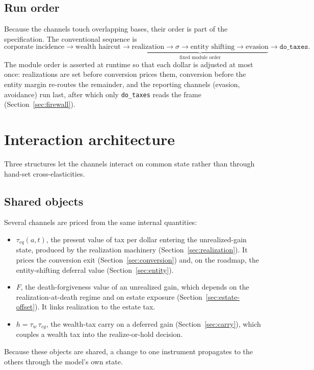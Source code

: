 \documentclass[11pt]{article}
\newcommand{\code}[1]{\texttt{\small #1}}
\begin{document}
\subsection{Run order}
\label{sec:order}
Because the channels touch overlapping bases, their order is part of the
specification. The conventional sequence is
\[
\text{corporate incidence} \rightarrow \text{wealth haircut} \rightarrow
\underbrace{\text{realization} \rightarrow \sigma \rightarrow
\text{entity shifting} \rightarrow \text{evasion}}_{\text{fixed module order}}
\rightarrow \texttt{do\_taxes}.
\]
The module order is asserted at runtime so that each dollar is adjusted at most
once: realizations are set before conversion prices them, conversion before the
entity margin re-routes the remainder, and the reporting channels (evasion,
avoidance) run last, after which only \code{do_taxes} reads the frame
(Section~\ref{sec:firewall}).

\section{Interaction architecture}
\label{sec:architecture}

Three structures let the channels interact on common state rather than through
hand-set cross-elasticities.

\subsection{Shared objects}
\label{sec:shared}
Several channels are priced from the same internal quantities:
\begin{itemize}[leftmargin=1.4em]
\item $\tau_{eq}(a,t)$, the present value of tax per dollar entering the
unrealized-gain state, produced by the realization machinery
(Section~\ref{sec:realization}). It prices the conversion exit
(Section~\ref{sec:conversion}) and, on the roadmap, the entity-shifting deferral
value (Section~\ref{sec:entity}).
\item $F$, the death-forgiveness value of an unrealized gain, which depends on
the realization-at-death regime and on estate exposure
(Section~\ref{sec:estate-offset}). It links realization to the estate tax.
\item $h=\tau_w\,\tau_{cg}$, the wealth-tax carry on a deferred gain
(Section~\ref{sec:carry}), which couples a wealth tax into the realize-or-hold
decision.
\end{itemize}
Because these objects are shared, a change to one instrument propagates to the
others through the model's own state.
\end{document}
